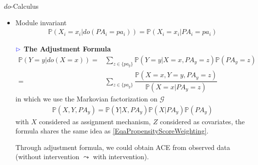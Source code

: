     \begin{point}
        $ do $-Calculus
    \end{point}
    \begin{itemize}[topsep=2pt,itemsep=0pt]
        \item Module invariant
        \begin{align}
            \mathbb{P}\left( X_i=x_i\big| do(PA_i=pa_i) \right) = \mathbb{P}\left( X_i=x_i\big| PA_i=pa_i \right)  
        \end{align}
        \item[$ \color{blue}\vartriangleright  $]\textbf{ The Adjustment Formula} 
        \begin{align}
            \mathbb{P}\left( Y=y\big| do(X=x) \right) =& \sum_{z\in\{ pa_y \}} \mathbb{P}\left( Y=y\big| X=x, PA_y=z \right)\mathbb{P}\left( PA_y=z \right)  \\
            =& \sum_{z\in\{pa_y\}}\dfrac{\mathbb{P}\left( X=x, Y=y,PA_y=z \right) }{\mathbb{P}\left( X=x\big| PA_y=z \right) } 
        \end{align}
        in which we use the Markovian factorization on $ \mathcal{G} $
        \begin{align}
            \mathbb{P}\left( X,Y,PA_y \right) = \mathbb{P}\left( Y|X,PA_y \right)\mathbb{P}\left( X|PA_y \right)   \mathbb{P}\left( PA_y \right)  
        \end{align}
        with $ X $ considered as assignment mechanism, $ Z $ considered as covariates, the formula shares the same idea as \autoref{EqaPropensityScoreWeighting}.
        
        Through adjustment formula, we could obtain ACE from observed data (without intervention $ \leadsto $ with intervention).
        
\end{itemize}
